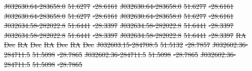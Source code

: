 \documentclass[11pt, a4paper]{book}
\providecommand{\DIFdeltex}[1]{{\protect\color{red}\sout{#1}}}                      %
\providecommand{\DIFdel}[1]{\texorpdfstring{\DIFdeltex{#1}}{}} %
\begin{document}
\DIFdel{J032630.64-283658.0 }%
\DIFdel{51.6277 }%
\DIFdel{-28.6161 }%
\DIFdel{J032630.64-283658.0 }%
\DIFdel{51.6277 }%
\DIFdel{-28.6161 }%
\DIFdel{J032630.64-283658.0 }%
\DIFdel{51.6277 }%
\DIFdel{-28.6161 }%
\DIFdel{J032630.64-283658.0 }%
\DIFdel{51.6277 }%
\DIFdel{-28.6161}%
\DIFdel{J032634.58-282022.8 }%
\DIFdel{51.6441 }%
\DIFdel{-28.3397 }%
\DIFdel{J032634.58-282022.8 }%
\DIFdel{51.6441 }%
\DIFdel{-28.3397 }%
\DIFdel{J032634.58-282022.8 }%
\DIFdel{51.6441 }%
\DIFdel{-28.3397 }%
\DIFdel{J032634.58-282022.8 }%
\DIFdel{51.6441 }%
\DIFdel{-28.3397}%
\DIFdel{RA }%
\DIFdel{Dec }%
\DIFdel{RA }%
\DIFdel{Dec }%
\DIFdel{RA }%
\DIFdel{Dec }%
\DIFdel{RA }%
\DIFdel{Dec }%
\DIFdel{J032603.15-284708.5 }%
\DIFdel{51.5132 }%
\DIFdel{-28.7857 }%
\DIFdel{J032602.36-284711.5 }%
\DIFdel{51.5098 }%
\DIFdel{-28.7865 }%
\DIFdel{J032602.36-284711.5 }%
\DIFdel{51.5098 }%
\DIFdel{-28.7865 }%
\DIFdel{J032602.36-284711.5 }%
\DIFdel{51.5098 }%
\DIFdel{-28.7865 }%
\end{document}
